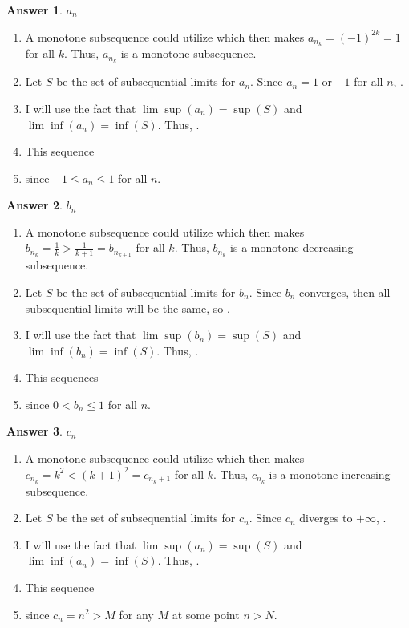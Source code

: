 \documentclass[10pt,a4paper]{article}
\theoremstyle{definition}
\newtheorem*{answer*}{Answer}
\begin{document}
\begin{answer*}{$a_n$}
\begin{enumerate}[label = (\alph*)]
\item A monotone subsequence could utilize  which then makes $a_{n_k} =(-1)^{2k} = 1$ for all $k$. Thus, $a_{n_k}$ is a monotone subsequence.
\item Let $S$ be the set of subsequential limits for $a_n$. Since $a_n = 1$ or $-1$ for all $n$, .
\item I will use the fact that $\lim \sup(a_n) = \sup(S)$ and $\lim \inf(a_n) = \inf(S)$. Thus, .
\item This sequence 
\item {} since $-1 \leq a_n \leq 1$ for all $n$.
\end{enumerate}
\end{answer*}

\begin{answer*}{$b_n$}
\begin{enumerate}[label = (\alph*)]
\item A monotone subsequence could utilize  which then makes $b_{n_k} = \frac{1}{k} > \frac{1}{k + 1} = b_{n_{k+1}}$ for all $k$. Thus, $b_{n_k}$ is a monotone decreasing subsequence.
\item Let $S$ be the set of subsequential limits for $b_n$. Since $b_n$ converges, then all subsequential limits will be the same, so .
\item I will use the fact that $\lim \sup(b_n) = \sup(S)$ and $\lim \inf(b_n) = \inf(S)$. Thus, .
\item This sequences 
\item {} since $0 < b_n \leq 1$ for all $n$.
\end{enumerate}
\end{answer*}

\begin{answer*}{$c_n$}
\begin{enumerate}[label = (\alph*)]
\item A monotone subsequence could utilize  which then makes $c_{n_k} = k^2 < (k+1)^2 = c_{n{_k+1}}$ for all $k$. Thus, $c_{n_k}$ is a monotone increasing subsequence.
\item Let $S$ be the set of subsequential limits for $c_n$. Since $c_n$ diverges to $+\infty$, .
\item I will use the fact that $\lim \sup(a_n) = \sup(S)$ and $\lim \inf(a_n) = \inf(S)$. Thus, .
\item This sequence 
\item {} since $c_n = n^2 > M$ for any $M$ at some point $n > N$.
\end{enumerate}
\end{answer*}
\end{document}
